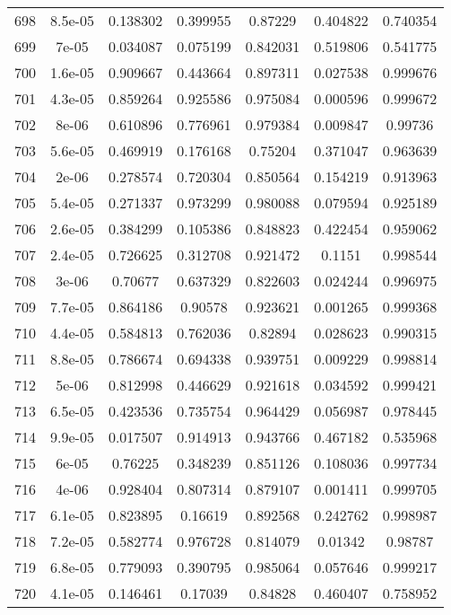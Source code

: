 \begin{table}
\begin{tabular}{c|c|c|c|c|c|c}
698 & 8.5e-05 & 0.138302 & 0.399955 & 0.87229 & 0.404822 & 0.740354\\
699 & 7e-05 & 0.034087 & 0.075199 & 0.842031 & 0.519806 & 0.541775\\
700 & 1.6e-05 & 0.909667 & 0.443664 & 0.897311 & 0.027538 & 0.999676\\
701 & 4.3e-05 & 0.859264 & 0.925586 & 0.975084 & 0.000596 & 0.999672\\
702 & 8e-06 & 0.610896 & 0.776961 & 0.979384 & 0.009847 & 0.99736\\
703 & 5.6e-05 & 0.469919 & 0.176168 & 0.75204 & 0.371047 & 0.963639\\
704 & 2e-06 & 0.278574 & 0.720304 & 0.850564 & 0.154219 & 0.913963\\
705 & 5.4e-05 & 0.271337 & 0.973299 & 0.980088 & 0.079594 & 0.925189\\
706 & 2.6e-05 & 0.384299 & 0.105386 & 0.848823 & 0.422454 & 0.959062\\
707 & 2.4e-05 & 0.726625 & 0.312708 & 0.921472 & 0.1151 & 0.998544\\
708 & 3e-06 & 0.70677 & 0.637329 & 0.822603 & 0.024244 & 0.996975\\
709 & 7.7e-05 & 0.864186 & 0.90578 & 0.923621 & 0.001265 & 0.999368\\
710 & 4.4e-05 & 0.584813 & 0.762036 & 0.82894 & 0.028623 & 0.990315\\
711 & 8.8e-05 & 0.786674 & 0.694338 & 0.939751 & 0.009229 & 0.998814\\
712 & 5e-06 & 0.812998 & 0.446629 & 0.921618 & 0.034592 & 0.999421\\
713 & 6.5e-05 & 0.423536 & 0.735754 & 0.964429 & 0.056987 & 0.978445\\
714 & 9.9e-05 & 0.017507 & 0.914913 & 0.943766 & 0.467182 & 0.535968\\
715 & 6e-05 & 0.76225 & 0.348239 & 0.851126 & 0.108036 & 0.997734\\
716 & 4e-06 & 0.928404 & 0.807314 & 0.879107 & 0.001411 & 0.999705\\
717 & 6.1e-05 & 0.823895 & 0.16619 & 0.892568 & 0.242762 & 0.998987\\
718 & 7.2e-05 & 0.582774 & 0.976728 & 0.814079 & 0.01342 & 0.98787\\
719 & 6.8e-05 & 0.779093 & 0.390795 & 0.985064 & 0.057646 & 0.999217\\
720 & 4.1e-05 & 0.146461 & 0.17039 & 0.84828 & 0.460407 & 0.758952\\
\end{tabular}
\end{table}
